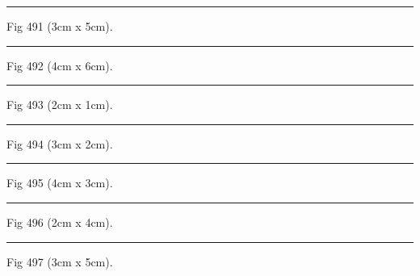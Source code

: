 \documentclass[a4paper,11pt]{article}
\begin{document}
\begin{swarmwrap}%
  \begin{minipage}[t]{3cm}
    \centering
    \rule{\linewidth}{5cm}
    {\footnotesize Fig 491 (3cm x 5cm).}
  \end{minipage}%
\end{swarmwrap}%
\swarmwrapnext
\lipsum[41]%

\begin{swarmwrap}%
  \begin{minipage}[t]{4cm}
    \centering
    \rule{\linewidth}{6cm}
    {\footnotesize Fig 492 (4cm x 6cm).}
  \end{minipage}%
\end{swarmwrap}%
\swarmwrapnext
\lipsum[42]%

\begin{swarmwrap}%
  \begin{minipage}[t]{2cm}
    \centering
    \rule{\linewidth}{1cm}
    {\footnotesize Fig 493 (2cm x 1cm).}
  \end{minipage}%
\end{swarmwrap}%
\swarmwrapnext
\lipsum[43]%

\begin{swarmwrap}%
  \begin{minipage}[t]{3cm}
    \centering
    \rule{\linewidth}{2cm}
    {\footnotesize Fig 494 (3cm x 2cm).}
  \end{minipage}%
\end{swarmwrap}%
\swarmwrapnext
\lipsum[44]%

\begin{swarmwrap}%
  \begin{minipage}[t]{4cm}
    \centering
    \rule{\linewidth}{3cm}
    {\footnotesize Fig 495 (4cm x 3cm).}
  \end{minipage}%
\end{swarmwrap}%
\swarmwrapnext
\lipsum[45]%

\begin{swarmwrap}%
  \begin{minipage}[t]{2cm}
    \centering
    \rule{\linewidth}{4cm}
    {\footnotesize Fig 496 (2cm x 4cm).}
  \end{minipage}%
\end{swarmwrap}%
\swarmwrapnext
\lipsum[46]%

\begin{swarmwrap}%
  \begin{minipage}[t]{3cm}
    \centering
    \rule{\linewidth}{5cm}
    {\footnotesize Fig 497 (3cm x 5cm).}
  \end{minipage}%
\end{swarmwrap}%
\swarmwrapnext
\lipsum[47]%
\end{document}
